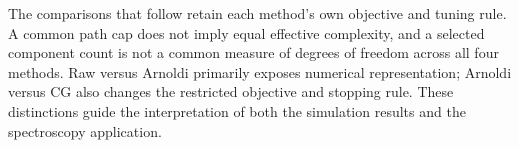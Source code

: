 The comparisons that follow retain each method's own objective and tuning
rule. A common path cap does not imply equal effective complexity, and a
selected component count is not a common measure of degrees of freedom
across all four methods. Raw versus Arnoldi primarily exposes numerical
representation; Arnoldi versus CG also changes the restricted objective
and stopping rule. These distinctions guide the interpretation of both the
simulation results and the spectroscopy application.
